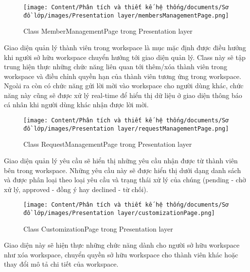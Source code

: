 \begin{figure}[H]
    \centering
    \texttt{[image: Content/Phân tích và thiết kế hệ thống/documents/Sơ đồ lớp/images/Presentation layer/membersManagementPage.png]}
    \vspace{0.5cm}
    \caption{Class MemberManagementPage trong Presentation layer}
    \label{fig:Class MemberManagementPage trong Presentation layer}
\end{figure}
Giao diện quản lý thành viên trong workspace là mục mặc định được điều hướng khi người sở hữu workspace chuyển hướng tới giao diện quản lý. Class này sẽ tập trung hiện thực những chức năng liên quan tới thêm/xóa thành viên trong workspace và điều chỉnh quyền hạn của thành viên tương ứng trong workspace. Ngoài ra còn có chức năng gửi lời mời vào workspace cho người dùng khác, chức năng này cũng sẽ được xử lý real-time để hiển thị dữ liệu ở giao diện thông báo cá nhân khi người dùng khác nhận được lời mời.

\begin{figure}[H]
    \centering
    \texttt{[image: Content/Phân tích và thiết kế hệ thống/documents/Sơ đồ lớp/images/Presentation layer/requestManagementPage.png]}
    \vspace{0.5cm}
    \caption{Class RequestManagementPage trong Presentation layer}
    \label{fig:Class RequestManagementPage trong Presentation layer}
\end{figure}
Giao diện quản lý yêu cầu sẽ hiển thị những yêu cầu nhận được từ thành viên bên trong workspace. Những yêu cầu này sẽ được hiển thị dưới dạng danh sách và được phân loại theo loại yêu cầu và trạng thái xử lý của chúng (pending - chờ xử lý, approved - đồng ý hay declined - từ chối).

\begin{figure}[H]
    \centering
    \texttt{[image: Content/Phân tích và thiết kế hệ thống/documents/Sơ đồ lớp/images/Presentation layer/customizationPage.png]}
    \vspace{0.5cm}
    \caption{Class CustomizationPage trong Presentation layer}
    \label{fig:Class CustomizationPage trong Presentation layer}
\end{figure}
Giao diện này sẽ hiện thực những chức năng dành cho người sở hữu workspace như xóa workspace, chuyển quyền sở hữu workspace cho thành viên khác hoặc thay đổi mô tả chi tiết của workspace.

